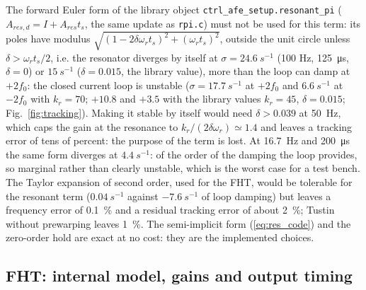 \documentclass[10pt,a4paper]{scrartcl}
\newcommand{\ts}{t_s}
\newcommand{\wres}{\omega_r}
\newcommand{\code}[1]{\texttt{#1}}
\begin{document}
\begin{onehalfspace}
The forward Euler form of the library object \code{ctrl\_afe\_setup.resonant\_pi} ($A_{res,d} = I + A_{res}\ts$, the same update as \code{rpi.c}) must not be used for this term: its poles have modulus $\sqrt{(1 - 2\delta\wres\ts)^2 + (\wres\ts)^2}$, outside the unit circle unless $\delta > \wres\ts/2$, i.e. the resonator diverges by itself at $\sigma = \SI{+24.6}{s^{-1}}$ (100 Hz, \SI{125}{\micro s}, $\delta = 0$) or $\SI{+15}{s^{-1}}$ ($\delta = 0.015$, the library value), more than the loop can damp at $+2f_0$: the closed current loop is unstable ($\sigma = \SI{+17.7}{s^{-1}}$ at $+2f_0$ and $\SI{+6.6}{s^{-1}}$ at $-2f_0$ with $k_r = 70$; $+10.8$ and $+3.5$ with the library values $k_r = 45$, $\delta = 0.015$; Fig.~\ref{fig:tracking}). Making it stable by itself would need $\delta > 0.039$ at \SI{50}{Hz}, which caps the gain at the resonance to $k_r/(2\delta\wres) \simeq 1.4$ and leaves a tracking error of tens of percent: the purpose of the term is lost. At \SI{16.7}{Hz} and \SI{200}{\micro s} the same form diverges at $\SI{+4.4}{s^{-1}}$: of the order of the damping the loop provides, so marginal rather than clearly unstable, which is the worst case for a test bench. The Taylor expansion of second order, used for the FHT, would be tolerable for the resonant term ($\SI{+0.04}{s^{-1}}$ against $\SI{-7.6}{s^{-1}}$ of loop damping) but leaves a frequency error of \SI{0.1}{\percent} and a residual tracking error of about \SI{2}{\percent}; Tustin without prewarping leaves \SI{1}{\percent}. The semi-implicit form (\ref{eq:res_code}) and the zero-order hold are exact at no cost: they are the implemented choices.

\subsection{FHT: internal model, gains and output timing}
\label{sec:disc_fht}


\end{onehalfspace}
\end{document}
